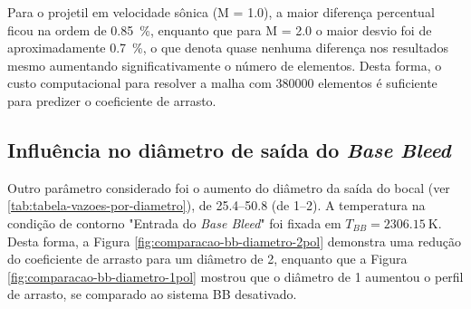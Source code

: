 Para o projetil em velocidade sônica (M = \num{1,0}), a maior diferença percentual ficou na ordem de \qty{0,85}{\percent}, enquanto que para M = \num{2,0} o maior desvio foi de aproximadamente \qty{0,7}{\percent}, o que denota quase nenhuma diferença nos resultados mesmo aumentando significativamente o número de elementos. Desta forma, o custo computacional para resolver a malha com \num{380000} elementos é suficiente para predizer o coeficiente de arrasto.

\subsection{Influência no diâmetro de saída do \textit{Base Bleed}} \label{subsec:resultados-com-basebleed-diametros}

Outro parâmetro considerado foi o aumento do diâmetro da saída do bocal (ver \autoref{tab:tabela-vazoes-por-diametro}), de \qtyrange{25,4}{50,8}{\millimetre} (de \qtyrange{1}{2}{\polegada}). A temperatura na condição de contorno "Entrada do \textit{Base Bleed}"{} foi fixada em \(T_{BB} = \qty{2306,15}{\kelvin}\). Desta forma, a Figura \ref{fig:comparacao-bb-diametro-2pol} demonstra uma redução do coeficiente de arrasto para um diâmetro de \qty{2}{\polegada}, enquanto que a Figura \ref{fig:comparacao-bb-diametro-1pol} mostrou que o diâmetro de \qty{1}{\polegada} aumentou o perfil de arrasto, se comparado ao sistema BB desativado.

